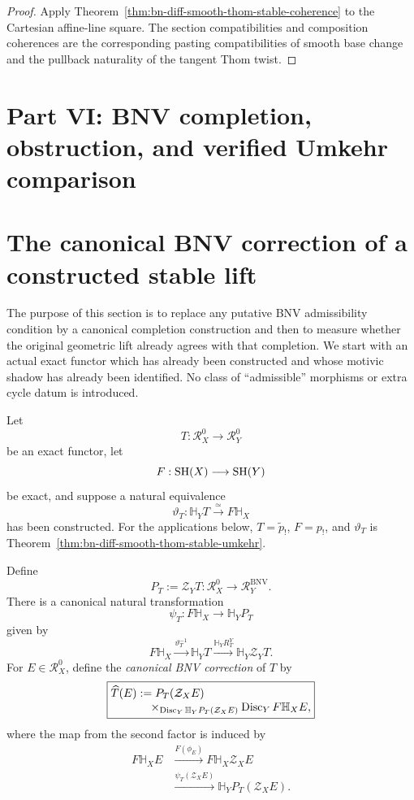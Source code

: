 \begin{proof}
Apply Theorem~\ref{thm:bn-diff-smooth-thom-stable-coherence} to the Cartesian
affine-line square.  The section compatibilities and composition coherences are
the corresponding pasting compatibilities of smooth base change and the
pullback naturality of the tangent Thom twist.
\end{proof}

\section*{Part VI: BNV completion, obstruction, and verified Umkehr comparison}

\section{The canonical BNV correction of a constructed stable lift}
\label{sec:bn-diff-canonical-bnv-correction}

The purpose of this section is to replace any putative BNV admissibility
condition by a canonical completion construction and then to measure whether
the original geometric lift already agrees with that completion.  We start
with an actual exact functor which has already been constructed and whose
motivic shadow has already been identified.  No class of ``admissible''
morphisms or extra cycle datum is introduced.

Let
\[
  T:\mathcal R_X^0\longrightarrow\mathcal R_Y^0
\]
be an exact functor, let
\[
  F:\mathrm{SH}(X)\longrightarrow\mathrm{SH}(Y)
\]
be exact, and suppose a natural equivalence
\[
  \vartheta_T:
  \mathbb H_YT
  \xrightarrow{\simeq}
  F\mathbb H_X
\]
has been constructed.  For the applications below,
\(T=\widetilde p_!\), \(F=p_!\), and
\(\vartheta_T\) is Theorem~\ref{thm:bn-diff-smooth-thom-stable-umkehr}.

\begin{construction}
\label{con:bn-diff-canonical-cycle-realization}
Define
\[
  P_T:=\mathcal Z_YT:
  \mathcal R_X^0\longrightarrow\mathcal R_Y^{\mathrm{BNV}}.
\]
There is a canonical natural transformation
\[
  \boxed{
  \psi_T:
  F\mathbb H_X
  \longrightarrow
  \mathbb H_YP_T
  }
\]
given by
\[
  F\mathbb H_X
  \xrightarrow{\vartheta_T^{-1}}
  \mathbb H_YT
  \xrightarrow{\mathbb H_YR^Y_T}
  \mathbb H_Y\mathcal Z_YT.
\]
For \(E\in\mathcal R_X^0\), define the \emph{canonical BNV correction} of
\(T\) by
\[
\boxed{
\begin{aligned}
  \widehat T(E)
  &:={}
  P_T(\mathcal Z_XE)
  \\[-1mm]
  &\quad\times_{
    \operatorname{Disc}_Y\mathbb H_YP_T(\mathcal Z_XE)
  }
  \operatorname{Disc}_YF\mathbb H_XE,
\end{aligned}}
\]
where the map from the second factor is induced by
\[
\begin{aligned}
  F\mathbb H_XE
  &\xrightarrow{F(\phi_E)}
  F\mathbb H_X\mathcal Z_XE\\
  &\xrightarrow{\psi_T(\mathcal Z_XE)}
  \mathbb H_YP_T(\mathcal Z_XE).
\end{aligned}
\]
\end{construction}

